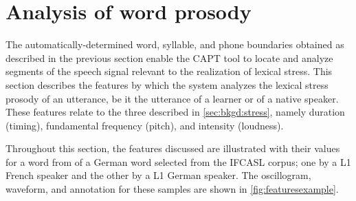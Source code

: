\section{Analysis of word prosody}
\label{sec:diag:prosody}
	
	The automatically-determined word, syllable, and phone boundaries obtained as described in the previous section 
	enable the CAPT tool to locate and analyze segments of the speech signal relevant to the realization of lexical stress.
	This section describes the features by which the system analyzes the lexical stress prosody of an utterance, be it the utterance of a learner or of a native speaker. These features relate to the three  described in \cref{sec:bkgd:stress}, namely duration (timing), fundamental frequency (pitch), and intensity (loudness). 
%
%	



	Throughout this section, the features discussed are illustrated with their values for a word from  of a German word selected from the IFCASL corpus; one by a L1 French speaker and the other by a L1 German speaker. The oscillogram, waveform, and annotation for these samples are shown in \cref{fig:featuresexample}.
	
